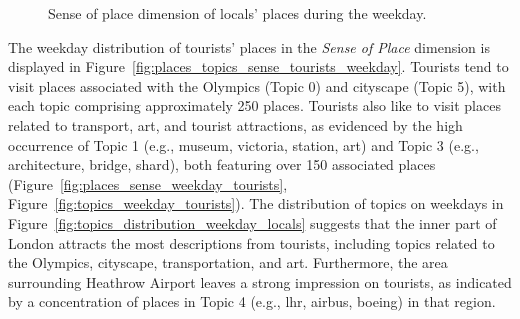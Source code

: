 \documentclass{article}
\theoremstyle{remark}
\begin{document}
\begin{figure}[!h]
    \caption{Sense of place dimension of locals' places during the weekday.}
    \label{fig:places_topics_sense_locals_weekday}
\end{figure}

The weekday distribution of tourists' places in the \textit{Sense of Place} dimension is displayed in Figure~\ref{fig:places_topics_sense_tourists_weekday}. Tourists tend to visit places associated with the Olympics (Topic 0) and cityscape (Topic 5), with each topic comprising approximately 250 places. Tourists also like to visit places related to transport, art, and tourist attractions, as evidenced by the high occurrence of Topic 1 (e.g., museum, victoria, station, art) and Topic 3 (e.g., architecture, bridge, shard), both featuring over 150 associated places (Figure~\ref{fig:places_sense_weekday_tourists}, Figure~\ref{fig:topics_weekday_tourists}). The distribution of topics on weekdays in Figure~\ref{fig:topics_distribution_weekday_locals} suggests that the inner part of London attracts the most descriptions from tourists, including topics related to the Olympics, cityscape, transportation, and art. Furthermore, the area surrounding Heathrow Airport leaves a strong impression on tourists, as indicated by a concentration of places in Topic 4 (e.g., lhr, airbus, boeing) in that region.
\end{document}
